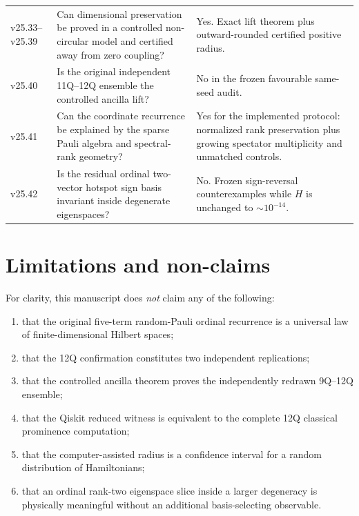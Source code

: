 \documentclass[11pt,a4paper]{article}
\begin{document}
\begin{longtable}{@{}p{}p{}p{}@{}}
v25.33--v25.39 &
Can dimensional preservation be proved in a controlled non-circular model and
certified away from zero coupling? &
Yes. Exact lift theorem plus outward-rounded certified positive radius.\\

v25.40 &
Is the original independent 11Q--12Q ensemble the controlled ancilla lift? &
No in the frozen favourable same-seed audit.\\

v25.41 &
Can the coordinate recurrence be explained by the sparse Pauli algebra and
spectral-rank geometry? &
Yes for the implemented protocol: normalized rank preservation plus growing
spectator multiplicity and unmatched controls.\\

v25.42 &
Is the residual ordinal two-vector hotspot sign basis invariant inside
degenerate eigenspaces? &
No. Frozen sign-reversal counterexamples while \(H\) is unchanged to
\(\sim10^{-14}\).\\
\bottomrule
\end{longtable}


\section{Limitations and non-claims}

For clarity, this manuscript does \emph{not} claim any of the following:

\begin{enumerate}[label=\arabic*.]
\item that the original five-term random-Pauli ordinal recurrence is a
      universal law of finite-dimensional Hilbert spaces;
\item that the 12Q confirmation constitutes two independent replications;
\item that the controlled ancilla theorem proves the independently redrawn
      9Q--12Q ensemble;
\item that the Qiskit reduced witness is equivalent to the complete 12Q
      classical prominence computation;
\item that the computer-assisted radius is a confidence interval for a random
      distribution of Hamiltonians;
\item that an ordinal rank-two eigenspace slice inside a larger degeneracy is
      physically meaningful without an additional basis-selecting observable.
\end{enumerate}
\end{document}
